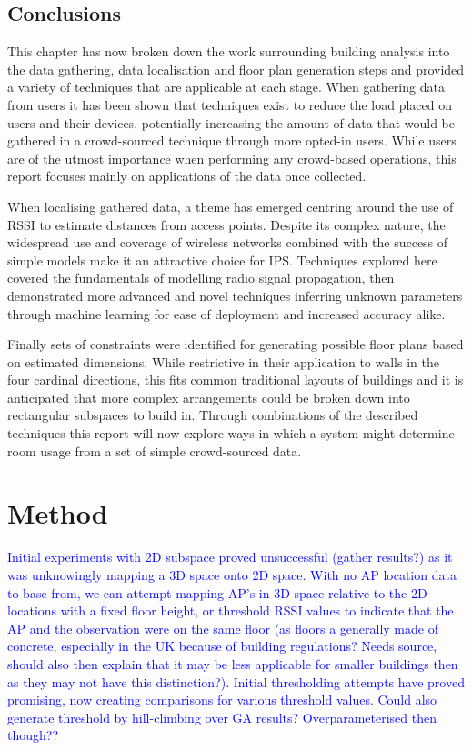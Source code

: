 \documentclass{UoYCSproject}
\begin{document}
        \section{Conclusions}
        
	        This chapter has now broken down the work surrounding building analysis into the data gathering, data localisation and floor plan generation steps and provided a variety of techniques that are applicable at each stage. When gathering data from users it has been shown that techniques exist to reduce the load placed on users and their devices, potentially increasing the amount of data that would be gathered in a crowd-sourced technique through more opted-in users. While users are of the utmost importance when performing any crowd-based operations, this report focuses mainly on applications of the data once collected.
            
            When localising gathered data, a theme has emerged centring around the use of RSSI to estimate distances from access points. Despite its complex nature, the  widespread use and coverage of wireless networks combined with the success of simple models make it an attractive choice for IPS. Techniques explored here covered the fundamentals of modelling radio signal propagation, then demonstrated more advanced and novel techniques inferring unknown parameters through machine learning for ease of deployment and increased accuracy alike.
            
            Finally sets of constraints were identified for generating possible floor plans based on estimated dimensions. While restrictive in their application to walls in the four cardinal directions, this fits common traditional layouts of buildings and it is anticipated that more complex arrangements could be broken down into rectangular subspaces to build in. Through combinations of the described techniques this report will now explore ways in which a system might determine room usage from a set of simple crowd-sourced data.

	\chapter{Method}
    
        \textcolor{blue}{Initial experiments with 2D subspace proved unsuccessful (gather results?) as it was unknowingly mapping a 3D space onto 2D space. With no AP location data to base from, we can attempt mapping AP's in 3D space relative to the 2D locations with a fixed floor height, or threshold RSSI values to indicate that the AP and the observation were on the same floor (as floors a generally made of concrete, especially in the UK because of building regulations? Needs source, should also then explain that it may be less applicable for smaller buildings then as they may not have this distinction?). Initial thresholding attempts have proved promising, now creating comparisons for various threshold values. Could also generate threshold by hill-climbing over GA results? Overparameterised then though??}
        
\end{document}

